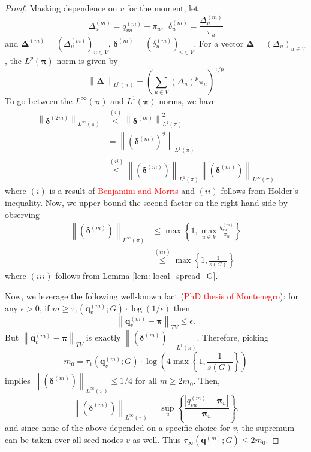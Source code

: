 \documentclass{article}
\newcommand{\abs}[1]{\left \lvert #1 \right \rvert}
\newcommand{\norm}[1]{\left\lVert#1\right\rVert}
\newcommand{\1}{\mathbf{1}}
\newcommand{\qbf}{\mathbf{q}}
\newcommand{\pibf}{\bm{\pi}}
\newcommand{\Deltabf}{\bm{\Delta}}
\newcommand{\deltabf}{\bm{\delta}}
\theoremstyle{aldenthm}
\begin{document}
\begin{proof}
	Masking dependence on $v$ for the moment, let
	\begin{equation*}
	\Delta_u^{(m)} = q_{vu}^{(m)} - \pi_u, ~~ \delta_u^{(m)} = \frac{\Delta_u^{(m)}}{\pi_u}
	\end{equation*}
	and $\Deltabf^{(m)} = (\Delta_u^{(m)})_{u \in V}$, $\deltabf^{(m)} = (\delta_u^{(m)})_{u \in V}$. For a vector $\Deltabf = (\Delta_u)_{u \in V}$, the $L^{p}(\pibf)$ norm is given by
	\begin{equation*}
	\norm{\Deltabf}_{L^p(\pibf)} = \left(\sum_{u \in V} \left(\Delta_u\right)^{p} \pi_u \right)^{1/p}
	\end{equation*}
	To go between the $L^{\infty}(\pibf)$ and $L^{1}(\pibf)$ norms, we have
	\begin{align*}
	\norm{\deltabf^{(2m)}}_{L^{\infty}(\pi)} & \overset{(i)}{\leq} \norm{\deltabf^{(m)}}^2_{L^{2}(\pi)} \\
	& = \norm{(\deltabf^{(m)})^2}_{L^{1}(\pi)} \\
	& \overset{(ii)}{\leq}  \norm{(\deltabf^{(m)})}_{L^{1}(\pi)} \norm{(\deltabf^{(m)})}_{L^{\infty}(\pi)}
	\end{align*}
	where $(i)$ is a result of \textcolor{red}{Benjamini and Morris} and $(ii)$ follows from Holder's inequality. Now, we upper bound the second factor on the right hand side by observing
	\begin{align*}
	\norm{(\deltabf^{(m)})}_{L^{\infty}(\pi)} & \leq \max\left\{1, \max_{u \in V} \frac{q_{vu}^{(m)}}{\pi_u} \right\} \\
	& \overset{(iii)}{\leq} \max\left\{1, \frac{1}{s(G)}\right\}
	\end{align*}
	where $(iii)$ follows from Lemma \ref{lem: local_spread_G}.
	
	Now, we leverage the following well-known fact (\textcolor{red}{PhD thesis of Montenegro}): for any $\epsilon > 0$, if $m \geq \tau_1(\qbf_v^{(m)}; G) \cdot \log(1/\epsilon)$ then
	\begin{equation*}
	\norm{\qbf_v^{(m)} - \pibf}_{TV} \leq \epsilon.
	\end{equation*}
	But $\norm{\qbf_v^{(m)} - \pibf}_{TV}$ is exactly $\norm{(\deltabf^{(m)})}_{L^{1}(\pi)}$. Therefore, picking 
	\begin{equation*}
	m_0 = \tau_1(\qbf_v^{(m)}; G) \cdot \log \left(4 \max\left\{1, \frac{1}{s(G)}\right\} \right)
	\end{equation*} implies $\norm{(\deltabf^{(m)})}_{L^{\infty}(\pi)} \leq 1/4$ for all $m \geq 2 m_0$.  Then, 
	\begin{equation*}
	\norm{(\deltabf^{(m)})}_{L^{\infty}(\pi)} = \sup_{u}\left\{ \frac{\abs{q_{vu}^{(m)} - \pibf_u}}{\pibf_u} \right\}.
	\end{equation*}
	and since none of the above depended on a specific choice for $v$, the supremum can be taken over all seed nodes $v$ as well. Thus $\tau_{\infty}(\qbf^{(m)}; G) \leq 2m_0$. 
	

\end{proof}
\end{document}
